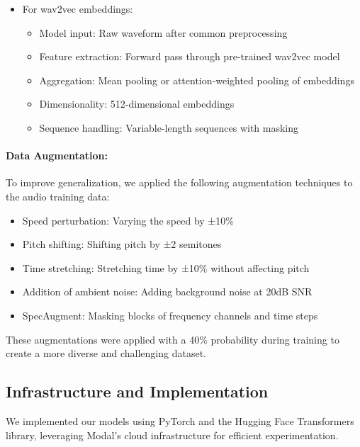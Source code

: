 \documentclass[12pt]{article}
\begin{document}
\begin{itemize}
    \item For wav2vec embeddings:
    \begin{itemize}
        \item Model input: Raw waveform after common preprocessing
        \item Feature extraction: Forward pass through pre-trained wav2vec model
        \item Aggregation: Mean pooling or attention-weighted pooling of embeddings
        \item Dimensionality: 512-dimensional embeddings
        \item Sequence handling: Variable-length sequences with masking
    \end{itemize}
\end{itemize}

\paragraph{Data Augmentation:}
To improve generalization, we applied the following augmentation techniques to the audio training data:
\begin{itemize}
    \item Speed perturbation: Varying the speed by ±10\%
    \item Pitch shifting: Shifting pitch by ±2 semitones
    \item Time stretching: Stretching time by ±10\% without affecting pitch
    \item Addition of ambient noise: Adding background noise at 20dB SNR
    \item SpecAugment: Masking blocks of frequency channels and time steps
\end{itemize}

These augmentations were applied with a 40\% probability during training to create a more diverse and challenging dataset.

\subsection{Infrastructure and Implementation}
\label{subsec:infrastructure}
We implemented our models using PyTorch and the Hugging Face Transformers library, leveraging Modal's cloud infrastructure for efficient experimentation.
\end{document}
